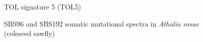 \begin{figure}[htbp!]
\caption{TOL signature 5 (TOL5)}
\label{figure:TOL5}
\begin{centering}
\end{centering}
\end{figure}

\begin{figure}[htbp!]
\caption{SBS96 and SBS192 somatic mutational spectra in \textit{Athalia rosae} (coleseed sawfly)}
\label{figure:iyAthRosa1-SBS96-SBS192}
\begin{centering}
\end{centering}
\end{figure}

